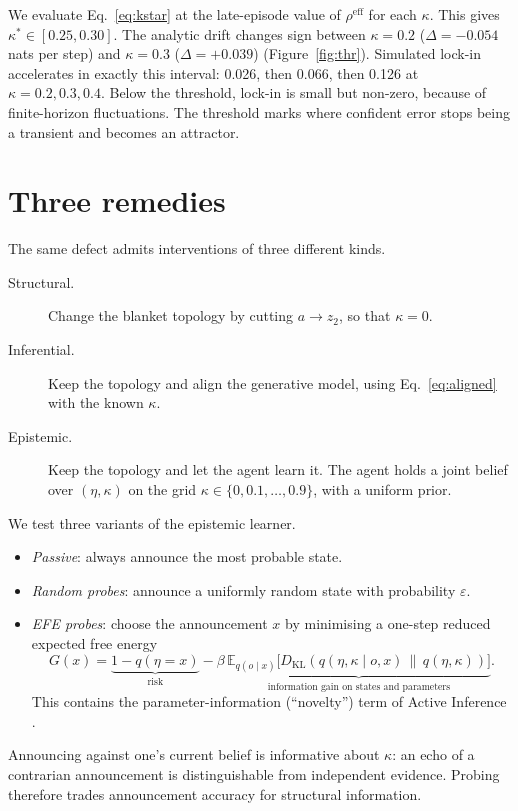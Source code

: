 \documentclass[11pt]{article}
\theoremstyle{definition}
\theoremstyle{remark}
\newcommand{\reff}{\rho^{\mathrm{eff}}}
\begin{document}
We evaluate Eq.~\eqref{eq:kstar} at the late-episode value of $\reff$ for each
$\kappa$. This gives $\kappa^\ast\in[0.25,0.30]$. The analytic drift changes
sign between $\kappa=0.2$ ($\Delta=-0.054$ nats per step) and $\kappa=0.3$
($\Delta=+0.039$) (Figure~\ref{fig:thr}). Simulated lock-in accelerates in
exactly this interval: 0.026, then 0.066, then 0.126 at $\kappa=0.2,0.3,0.4$.
Below the threshold, lock-in is small but non-zero, because of finite-horizon
fluctuations. The threshold marks where confident error stops being a transient
and becomes an attractor.

\section{Three remedies}\label{sec:remedies}

The same defect admits interventions of three different kinds.
\begin{description}
\item[Structural.] Change the blanket topology by cutting $a\to z_2$, so that
      $\kappa=0$.
\item[Inferential.] Keep the topology and align the generative model, using
      Eq.~\eqref{eq:aligned} with the known $\kappa$.
\item[Epistemic.] Keep the topology and let the agent learn it. The agent holds
      a joint belief over $(\eta,\kappa)$ on the grid
      $\kappa\in\{0,0.1,\dots,0.9\}$, with a uniform prior.
\end{description}

We test three variants of the epistemic learner.
\begin{itemize}
\item \emph{Passive}: always announce the most probable state.
\item \emph{Random probes}: announce a uniformly random state with probability
      $\varepsilon$.
\item \emph{EFE probes}: choose the announcement $x$ by minimising a one-step
      reduced expected free energy
      \begin{equation}
      G(x)=\underbrace{1-q(\eta=x)}_{\text{risk}}
      -\beta\,\underbrace{\mathbb{E}_{q(o\mid x)}\big[D_{\mathrm{KL}}(q(\eta,\kappa\mid o,x)\,\|\,q(\eta,\kappa))\big]}_{\text{information gain on states and parameters}}.
      \end{equation}
      This contains the parameter-information (``novelty'') term of Active
      Inference \citep{friston2017curiosity,schwartenbeck2019}.
\end{itemize}
Announcing against one's current belief is informative about $\kappa$: an echo
of a contrarian announcement is distinguishable from independent evidence.
Probing therefore trades announcement accuracy for structural information.
\end{document}
